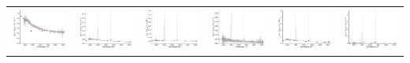 \begin{center}
\begin{longtable}{l l l l l l }
    \includegraphics[width=0.3\linewidth, clip]{Figs/Figs-sdss/spec-0332-52367-0306-SPLUS-n03s23-034002.pdf} & \includegraphics[width=0.3\linewidth, clip]{Figs/Figs-sdss/spec-0334-51993-0065-SPLUS-n03s28-019988.pdf} & \includegraphics[width=0.3\linewidth, clip]{Figs/Figs-sdss/spec-0334-51993-0365-SPLUS-n02s27-030519.pdf} & \includegraphics[width=0.3\linewidth, clip]{Figs/Figs-sdss/spec-0334-51993-0443-SPLUS-n02s28-028453.pdf} & \includegraphics[width=0.3\linewidth, clip]{Figs/Figs-sdss/spec-0371-52078-0576-STRIPE82-0128-050321.pdf} & \includegraphics[width=0.3\linewidth, clip]{Figs/Figs-sdss/spec-0372-52173-0286-STRIPE82-0127-009047.pdf} \\

\end{longtable}
\end{center}
